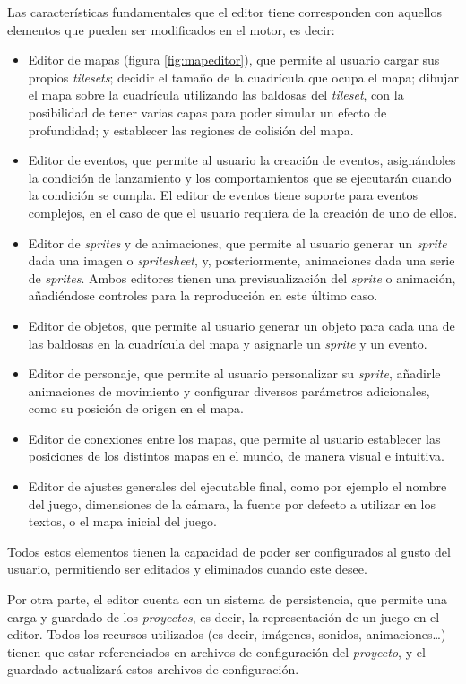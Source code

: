 Las características fundamentales que el editor tiene corresponden con aquellos elementos que pueden ser modificados en el motor, es decir:
\begin{itemize}
	\item Editor de mapas (figura \ref{fig:mapeditor}), que permite al usuario cargar sus propios \textit{tilesets}; decidir el tamaño de la cuadrícula que ocupa el mapa; dibujar el mapa sobre la cuadrícula utilizando las baldosas del \textit{tileset}, con la posibilidad de tener varias capas para poder simular un efecto de profundidad; y establecer las regiones de colisión del mapa.
	\item Editor de eventos, que permite al usuario la creación de eventos, asignándoles la condición de lanzamiento y los comportamientos que se ejecutarán cuando la condición se cumpla. El editor de eventos tiene soporte para eventos complejos, en el caso de que el usuario requiera de la creación de uno de ellos.
	\item Editor de \textit{sprites} y de animaciones, que permite al usuario generar un \textit{sprite} dada una imagen o \textit{spritesheet}, y, posteriormente, animaciones dada una serie de \textit{sprites}. Ambos editores tienen una previsualización del \textit{sprite} o animación, añadiéndose controles para la reproducción en este último caso. 
	\item Editor de objetos, que permite al usuario generar un objeto para cada una de las baldosas en la cuadrícula del mapa y asignarle un \textit{sprite} y un evento.
	\item Editor de personaje, que permite al usuario personalizar su \textit{sprite}, añadirle animaciones de movimiento y configurar diversos parámetros adicionales, como su posición de origen en el mapa.
	\item Editor de conexiones entre los mapas, que permite al usuario establecer las posiciones de los distintos mapas en el mundo, de manera visual e intuitiva.
	\item Editor de ajustes generales del ejecutable final, como por ejemplo el nombre del juego, dimensiones de la cámara, la fuente por defecto a utilizar en los textos, o el mapa inicial del juego.
\end{itemize} 

Todos estos elementos tienen la capacidad de poder ser configurados al gusto del usuario, permitiendo ser editados y eliminados cuando este desee.

\medskip

Por otra parte, el editor cuenta con un sistema de persistencia, que permite una carga y guardado de los \textit{proyectos}, es decir, la representación de un juego en el editor. Todos los recursos utilizados (es decir, imágenes, sonidos, animaciones\ldots) tienen que estar referenciados en archivos de configuración del \textit{proyecto}, y el guardado actualizará estos archivos de configuración.

